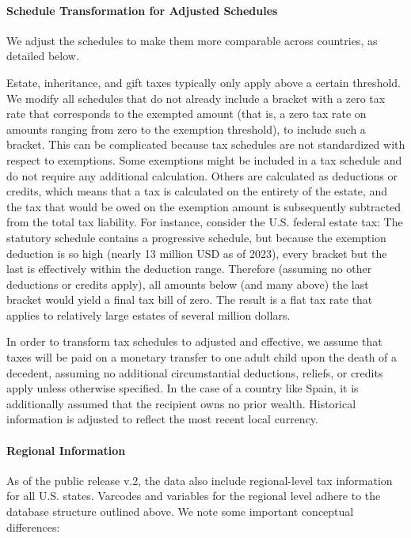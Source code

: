 \documentclass[
]{article}
\begin{document}
\paragraph{Schedule Transformation for Adjusted
Schedules}\label{schedule-transformation-for-adjusted-schedules}

We adjust the schedules to make them more comparable across countries,
as detailed below.

Estate, inheritance, and gift taxes typically only apply above a certain
threshold. We modify all schedules that do not already include a bracket
with a zero tax rate that corresponds to the exempted amount (that is, a
zero tax rate on amounts ranging from zero to the exemption threshold),
to include such a bracket. This can be complicated because tax schedules
are not standardized with respect to exemptions. Some exemptions might
be included in a tax schedule and do not require any additional
calculation. Others are calculated as deductions or credits, which means
that a tax is calculated on the entirety of the estate, and the tax that
would be owed on the exemption amount is subsequently subtracted from
the total tax liability. For instance, consider the U.S. federal estate
tax: The statutory schedule contains a progressive schedule, but because
the exemption deduction is so high (nearly 13 million USD as of 2023),
every bracket but the last is effectively within the deduction range.
Therefore (assuming no other deductions or credits apply), all amounts
below (and many above) the last bracket would yield a final tax bill of
zero. The result is a flat tax rate that applies to relatively large
estates of several million dollars.

In order to transform tax schedules to adjusted and effective, we assume
that taxes will be paid on a monetary transfer to one adult child upon
the death of a decedent, assuming no additional circumstantial
deductions, reliefs, or credits apply unless otherwise specified. In the
case of a country like Spain, it is additionally assumed that the
recipient owns no prior wealth. Historical information is adjusted to
reflect the most recent local currency.

\paragraph{Regional Information}\label{regional-information}

As of the public release v.2, the data also include regional-level tax
information for all U.S. states. Varcodes and variables for the regional
level adhere to the database structure outlined above. We note some
important conceptual differences:
\end{document}
